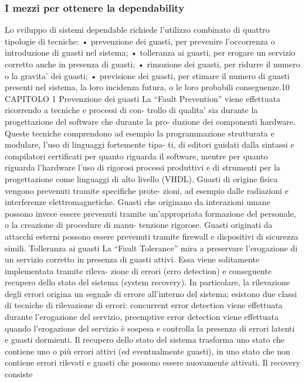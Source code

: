 \documentclass[14pt]{extarticle}
\begin{document}
\subsubsection{I mezzi per ottenere la dependability}
Lo sviluppo di sistemi dependable richiede l’utilizzo combinato di quattro
tipologie di tecniche:
• prevenzione dei guasti, per prevenire l’occorrenza o introduzione di
guasti nel sistema;
• tolleranza ai guasti, per erogare un servizio corretto anche in presenza
di guasti;
• rimozione dei guasti, per ridurre il numero o la gravita’ dei guasti;
• previsione dei guasti, per stimare il numero di guasti presenti nel
sistema, la loro incidenza futura, o le loro probabili conseguenze.10
CAPITOLO 1
Prevenzione dei guasti
La “Fault Prevention” viene effettuata ricorrendo a tecniche e processi di con-
trollo di qualita’ sia durante la progettazione del software che durante la pro-
duzione dei componenti hardware. Queste tecniche comprendono ad esempio
la programmazione strutturata e modulare, l’uso di linguaggi fortemente tipa-
ti, di editori guidati dalla sintassi e compilatori certificati per quanto riguarda
il software, mentre per quanto riguarda l’hardware l’uso di rigorosi processi
produttivi e di strumenti per la progettazione come linguaggi di alto livello
(VHDL). Guasti di origine fisica vengono prevenuti tramite specifiche prote-
zioni, ad esempio dalle radiazioni e interferenze elettromagnetiche. Guasti
che originano da interazioni umane possono invece essere prevenuti tramite
un’appropriata formazione del personale, o la creazione di procedure di manu-
tenzione rigorose. Guasti originati da attacchi esterni possono essere prevenuti
tramite firewall e dispositivi di sicurezza simili.
Tolleranza ai guasti
La “Fault Tolerance” mira a preservare l’erogazione di un servizio corretto in
presenza di guasti attivi. Essa viene solitamente implementata tramite rileva-
zione di errori (erro detection) e conseguente recupero dello stato del sistema
(system recovery). In particolare, la rilevazione degli errori origina un segnale
di errore all’interno del sistema; esistono due classi di tecniche di rilevazione
di errori: concurrent error detection viene effettuata durante l’erogazione del
servizio, preemptive error detection viene effettuata quando l’erogazione del
servizio è sospesa e controlla la presenza di errori latenti e guasti dormienti.
Il recupero dello stato del sistema trasforma uno stato che contiene uno o più
errori attivi (ed eventualmente guasti), in uno stato che non contiene errori
rilevati e guasti che possono essere nuovamente attivati. Il recovery consiste
\end{document}
